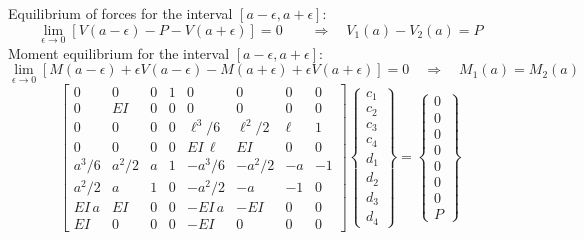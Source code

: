 \documentclass[11pt, oneside]{article}   	%
\begin{document}
Equilibrium of forces for the interval $[a-\epsilon,a+\epsilon]$:
\begin{equation}
   \lim_{\epsilon\to 0} \left[ V(a-\epsilon) - P - V(a+\epsilon)  \right] = 0
   \qquad\Rightarrow\quad
   V_1(a) - V_2(a) = P
   \label{B5}
\end{equation}
Moment equilibrium for the interval $[a-\epsilon,a+\epsilon]$:
\begin{equation}
   \lim_{\epsilon\to 0} \left[ M(a-\epsilon) + \epsilon V(a-\epsilon) - M(a+\epsilon) + \epsilon V(a+\epsilon) \right] = 0
   \quad\Rightarrow\quad
   M_1(a) = M_2(a)
   \label{B6}
\end{equation}
\begin{equation}
   \left[ 
   \begin{array}{cccccccc}
    0 & 0 & 0 & 1 & 0 & 0 & 0 & 0 \\[2ex]
    0 & EI & 0 & 0 & 0 & 0 & 0 & 0 \\[2ex]
    0 & 0 & 0 & 0 & \ell^3/6 & \ell^2/2 & \ell & 1 \\[2ex]
    0 & 0 & 0 & 0 & EI\,\ell & EI & 0 & 0 \\[2ex]
    a^3/6 & a^2/2 & a & 1 & -a^3/6 & -a^2/2 & -a & -1 \\[2ex]
    a^2/2 & a & 1 & 0 & -a^2/2 & -a & -1 & 0 \\[2ex]
    EI \,a & EI & 0 & 0 & -EI\,a & -EI & 0 & 0 \\[2ex]
    EI & 0 & 0 & 0 & -EI & 0 & 0 & 0 
   \end{array}
   \right]
   \left\{ 
   \begin{array}{c}
    c_1 \\[1.5ex]
    c_2 \\[1.5ex]
    c_3 \\[1.5ex]
    c_4 \\[1.5ex]
    d_1 \\[1.5ex]
    d_2 \\[1.5ex]
    d_3 \\[1.5ex]
    d_4
   \end{array}
   \right\}
   =
   \left\{ 
   \begin{array}{c}
    0 \\[1.5ex]
    0 \\[1.5ex]
    0 \\[1.5ex]
    0 \\[1.5ex]
    0 \\[1.5ex]
    0 \\[1.5ex]
    0 \\[1.5ex]
    P 
   \end{array}
   \right\}
   \label{B7}
\end{equation}
\end{document}
